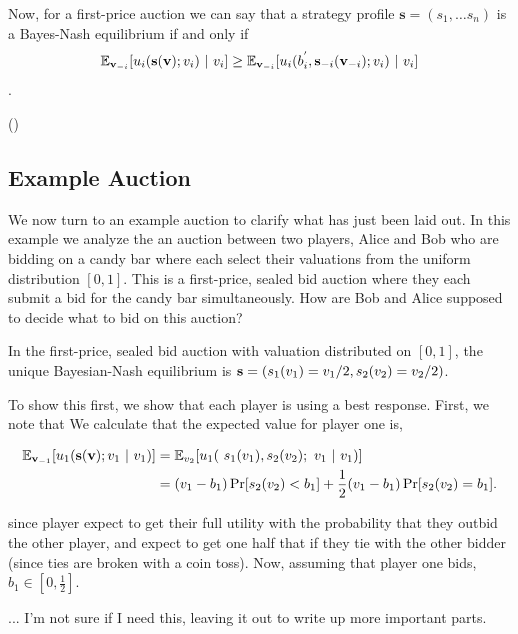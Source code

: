 \documentclass[12pt,twoside]{reedthesis}
\begin{document}
Now, for a first-price auction we can say that a strategy profile $\textbf{s} = (s_1, \ldots s_n)$ is a Bayes-Nash equilibrium if and only if 
$$ \mathbb{E}_{\textbf{v}_{-i}} [u_i(\textbf{s} (\textbf{v}); v_i) \ | \ v_i] \geq \mathbb{E}_{\textbf{v}_{-i}} [u_i(b^{'}_i, \textbf{s}_{-i}(\textbf{v}_{-i}); v_i) \ | \ v_i] $$.

(\cite{Roughgarden2017})

\subsection{Example Auction}
We now turn to an example auction to clarify what has just been laid out. In this example we analyze the an auction between two players, Alice and Bob who are bidding on a candy bar where each select their valuations from the uniform distribution $[0,1]$. This is a first-price, sealed bid auction where they each submit a bid for the candy bar simultaneously. How are Bob and Alice supposed to decide what to bid on this auction? 

\begin{prop}
	In the first-price, sealed bid auction with valuation distributed on $[0,1]$, the unique Bayesian-Nash equilibrium is $\textbf{s} = (s_1(v_1) = v_1 / 2, s_2(v_2) = v_2 / 2)$.
\end{prop}

To show this first, we show that each player is using a best response. First, we note that We calculate that the expected value for player one is,

\begin{align*}
	\EXP_{\valuations_{-1}} [u_1(\strategies(\valuations); v_1 \ | \ v_1)] &= \EXP_{v_2}[u_1( \ s_1(v_1), s_2(v_2); \ v_1 \ | \ v_1)] \\
	&= (v_1 - b_1) \Pr[s_2(v_2) < b_1] + \frac{1}{2}(v_1 - b_1)\Pr[s_2(v_2) = b_1].
\end{align*}

since player expect to get their full utility with the probability that they outbid the other player, and expect to get one half that if they tie with the other bidder (since ties are broken with a coin toss). Now, assuming that player one bids, $b_1 \in [0, \frac{1}{2}]$.

... I'm not sure if I need this, leaving it out to write up more important parts.
\end{document}
